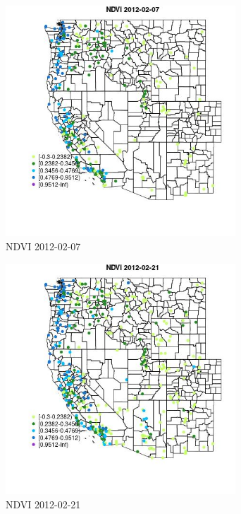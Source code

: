 \begin{figure} 
\centering  
\includegraphics[width=0.77\textwidth]{Code_Outputs/Report_ML_input_PM25_Step4_part_f_de_duplicated_aveswNAs_MapObsNDVI2012-02-07.jpg} 
\caption{\label{fig:Report_ML_input_PM25_Step4_part_f_de_duplicated_aveswNAsMapObsNDVI2012-02-07}NDVI 2012-02-07} 
\end{figure} 
 

\begin{figure} 
\centering  
\includegraphics[width=0.77\textwidth]{Code_Outputs/Report_ML_input_PM25_Step4_part_f_de_duplicated_aveswNAs_MapObsNDVI2012-02-21.jpg} 
\caption{\label{fig:Report_ML_input_PM25_Step4_part_f_de_duplicated_aveswNAsMapObsNDVI2012-02-21}NDVI 2012-02-21} 
\end{figure} 
 


